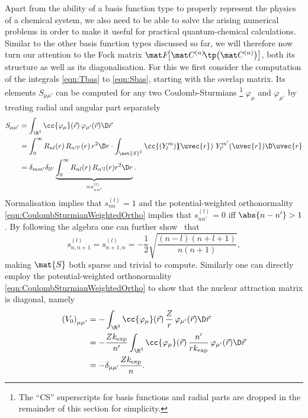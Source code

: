 Apart from the ability of a basis function type to properly
represent the physics of a chemical system, we also need to be able
to solve the arising numerical problems
in order to make it useful for practical quantum-chemical calculations.
Similar to the other basis function types discussed so far,
we will therefore now turn our attention to the Fock matrix $\matFnfull$,
both its structure as well as its diagonalisation.
For this we first consider the computation of the integrals
\eqref{eqn:Tbas} to \eqref{eqn:Sbas},
starting with the overlap matrix.
Its elements $S_{\mu\mu'}$ can be computed
for any two Coulomb-Sturmians%
\footnote{The ``CS'' superscripts for basis functions
and radial parts are dropped in the remainder of this section for simplicity.}
$\varphi_{\mu}$ and $\varphi_{\mu'}$
by treating radial and angular part separately~\cite{Avery2015}
\begin{equation}
	\begin{aligned}
	S_{\mu\mu'} &= \int_{\R^3} \cc{\varphi_{\mu}}(\vec{r}) \, \varphi_{\mu'}(\vec{r})  \D\vec{r} \\
	&= \int_0^\infty R_{nl}(r)\, R_{n'l'}(r) \, r^2 \D r \cdot
		\int_{\set{S}^2} \cc{\left(Y^m_l\right)}\!\!(\uvec{r}) \,\,
			Y^{m'}_{l'}(\uvec{r}) \D \uvec{r} \\
			&= \delta_{m m'} \delta_{l l'}
				\underbrace{\int_0^\infty R_{nl}(r)\, R_{n'l}(r) r^2 \D r}_{= s^{(l)}_{n n'}}.
	\end{aligned}
	\label{eqn:OverlapCS}
\end{equation}
Normalisation implies that $s^{(l)}_{n n} = 1$
and the potential-weighted orthonormality \eqref{eqn:CoulombSturmianWeightedOrtho}
implies that $s^{(l)}_{n n'} = 0$ iff $\abs{n -n'} > 1$.
By following the algebra one can further show~\cite{Avery2015} that
\[
	s^{(l)}_{n,n+1} = s^{(l)}_{n+1,n} = - \frac12 \sqrt{\frac{(n-l)(n+l+1)}{n (n+1)}},
\]
making $\mat{S}$ both sparse and trivial to compute.
Similarly one can directly employ the potential-weighted orthonormality \eqref{eqn:CoulombSturmianWeightedOrtho}
to show that the nuclear attraction matrix is diagonal, namely
\begin{equation}
	\begin{aligned}
	\left(V_0\right)_{\mu\mu'} &=
	- \int_{\R^3} \cc{\varphi_{\mu}}(\vec{r})\, \frac{Z}{r}\,
		\varphi_{\mu'}(\vec{r})  \D\vec{r} \\
	&= - \frac{Z\kexp}{n'} \int_{\R^3} \cc{\varphi_{\mu}}(\vec{r})\,
		\frac{n'}{r\kexp}\, \varphi_{\mu'}(\vec{r})  \D\vec{r} \\
	&= - \delta_{\mu \mu'} \frac{Z\kexp}{n}.
	\end{aligned}
	\label{eqn:NucAttrCS}
\end{equation}
